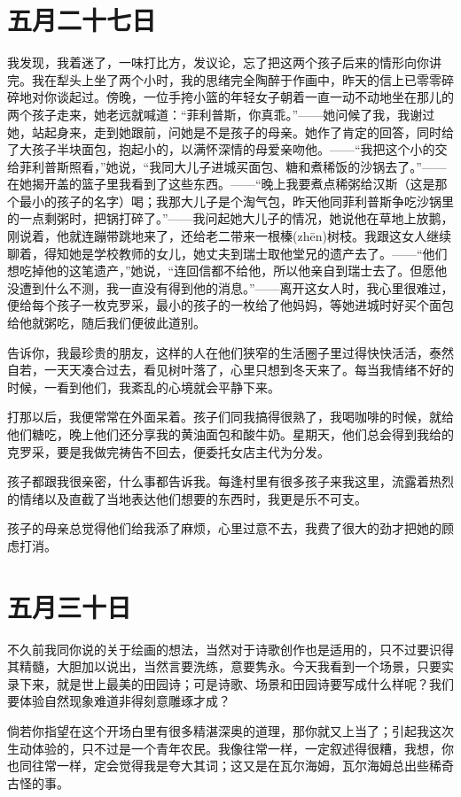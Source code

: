 \documentclass[12pt,oneside]{book}
\begin{document}
\chapter{五月二十七日}
\label{sec-2-9}
我发现，我着迷了，一味打比方，发议论，忘了把这两个孩子后来的情形向你讲完。我在犁头上坐了两个小时，我的思绪完全陶醉于作画中，昨天的信上已零零碎碎地对你谈起过。傍晚，一位手挎小篮的年轻女子朝着一直一动不动地坐在那儿的两个孩子走来，她老远就喊道：“菲利普斯，你真乖。”——她问候了我，我谢过她，站起身来，走到她跟前，问她是不是孩子的母亲。她作了肯定的回答，同时给了大孩子半块面包，抱起小的，以满怀深情的母爱亲吻他。——“我把这个小的交给菲利普斯照看，”她说，“我同大儿子进城买面包、糖和煮稀饭的沙锅去了。”——在她揭开盖的篮子里我看到了这些东西。——“晚上我要煮点稀粥给汉斯（这是那个最小的孩子的名字）喝；我那大儿子是个淘气包，昨天他同菲利普斯争吃沙锅里的一点剩粥时，把锅打碎了。”——我问起她大儿子的情况，她说他在草地上放鹅，刚说着，他就连蹦带跳地来了，还给老二带来一根榛(zhēn)树枝。我跟这女人继续聊着，得知她是学校教师的女儿，她丈夫到瑞士取他堂兄的遗产去了。——“他们想吃掉他的这笔遗产，”她说，“连回信都不给他，所以他亲自到瑞士去了。但愿他没遭到什么不测，我一直没有得到他的消息。”——离开这女人时，我心里很难过，便给每个孩子一枚克罗采，最小的孩子的一枚给了他妈妈，等她进城时好买个面包给他就粥吃，随后我们便彼此道别。

告诉你，我最珍贵的朋友，这样的人在他们狭窄的生活圈子里过得快快活活，泰然自若，一天天凑合过去，看见树叶落了，心里只想到冬天来了。每当我情绪不好的时候，一看到他们，我紊乱的心境就会平静下来。

打那以后，我便常常在外面呆着。孩子们同我搞得很熟了，我喝咖啡的时候，就给他们糖吃，晚上他们还分享我的黄油面包和酸牛奶。星期天，他们总会得到我给的克罗采，要是我做完祷告不回去，便委托女店主代为分发。

孩子都跟我很亲密，什么事都告诉我。每逢村里有很多孩子来我这里，流露着热烈的情绪以及直截了当地表达他们想要的东西时，我更是乐不可支。

孩子的母亲总觉得他们给我添了麻烦，心里过意不去，我费了很大的劲才把她的顾虑打消。


\chapter{五月三十日}
\label{sec-2-10}
不久前我同你说的关于绘画的想法，当然对于诗歌创作也是适用的，只不过要识得其精髓，大胆加以说出，当然言要洗练，意要隽永。今天我看到一个场景，只要实录下来，就是世上最美的田园诗；可是诗歌、场景和田园诗要写成什么样呢？我们要体验自然现象难道非得刻意雕琢才成？

倘若你指望在这个开场白里有很多精湛深奥的道理，那你就又上当了；引起我这次生动体验的，只不过是一个青年农民。我像往常一样，一定叙述得很糟，我想，你也同往常一样，定会觉得我是夸大其词；这又是在瓦尔海姆，瓦尔海姆总出些稀奇古怪的事。
\end{document}

